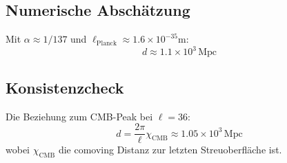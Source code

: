 \subsection{Numerische Abschätzung}

Mit $\alpha \approx 1/137$ und $\ell_{\text{Planck}} \approx 1.6\times10^{-35}$m:
\begin{equation}
d \approx 1.1\times10^3\,\text{Mpc}
\end{equation}

\subsection{Konsistenzcheck}

Die Beziehung zum CMB-Peak bei $\ell=36$:
\begin{equation}
d = \frac{2\pi}{\ell}\chi_{\text{CMB}} \approx 1.05\times10^3\,\text{Mpc}
\end{equation}
wobei $\chi_{\text{CMB}}$ die comoving Distanz zur letzten Streuoberfläche ist.
